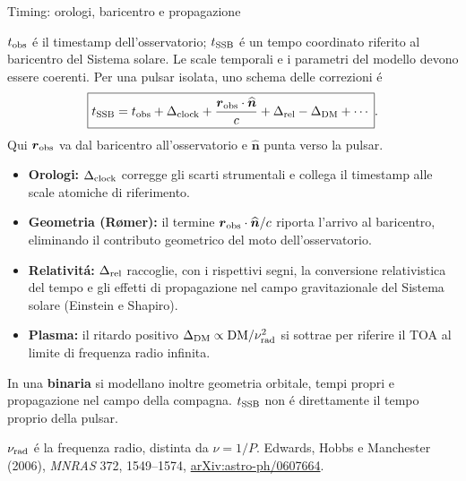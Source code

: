 \begin{frame}[t]{Timing: orologi, baricentro e propagazione}
\vspace*{3mm}
\small\raggedright
$t_{\rm obs}$ \'e il timestamp dell'osservatorio;
$t_{\rm SSB}$ \'e un tempo coordinato riferito al baricentro del Sistema solare.
Le scale temporali e i parametri del modello devono essere coerenti.
Per una pulsar isolata, uno schema delle correzioni \'e
\[
\boxed{t_{\rm SSB}=t_{\rm obs}+\Delta_{\rm clock}
+\frac{\boldsymbol r_{\rm obs}\cdot\widehat{\boldsymbol n}}{c}
+\Delta_{\rm rel}-\Delta_{\rm DM}+\cdots}.
\]
Qui $\boldsymbol r_{\rm obs}$ va dal baricentro all'osservatorio e
$\widehat{\boldsymbol n}$ punta verso la pulsar.
\begin{itemize}
\item \textbf{Orologi:} $\Delta_{\rm clock}$ corregge gli scarti strumentali
e collega il timestamp alle scale atomiche di riferimento.
\item \textbf{Geometria (R\o mer):} il termine
$\boldsymbol r_{\rm obs}\cdot\widehat{\boldsymbol n}/c$
riporta l'arrivo al baricentro, eliminando il contributo geometrico
del moto dell'osservatorio.
\item \textbf{Relativit\'a:} $\Delta_{\rm rel}$ raccoglie, con i rispettivi segni,
la conversione relativistica del tempo e gli effetti di propagazione
nel campo gravitazionale del Sistema solare (Einstein e Shapiro).
\item \textbf{Plasma:} il ritardo positivo
$\Delta_{\rm DM}\propto\mathrm{DM}/\nu_{\rm rad}^{2}$ si sottrae
per riferire il TOA al limite di frequenza radio infinita.
\end{itemize}
In una \textbf{binaria} si modellano inoltre geometria orbitale,
tempi propri e propagazione nel campo della compagna.
$t_{\rm SSB}$ non \'e direttamente il tempo proprio della pulsar.
\par\smallskip
\footnotesize
$\nu_{\rm rad}$ \'e la frequenza radio, distinta da $\nu=1/P$.
Edwards, Hobbs e Manchester (2006), \emph{MNRAS} 372, 1549--1574,
\href{https://arxiv.org/abs/astro-ph/0607664}{arXiv:astro-ph/0607664}.
\end{frame}

